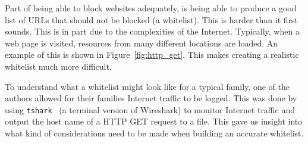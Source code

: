Part of being able to block websites adequately, is being able to produce a
good list of URLs that should not be blocked (a whitelist). This is harder than
it first sounds. This is in part due to the complexities of the Internet.
Typically, when a web page is visited, resources from many different locations
are loaded. An example of this is shown in Figure~\ref{fig:http_get}. This
makes creating a realistic whitelist much more difficult.

To understand what a whitelist might look like for a typical family, one of the
authors allowed for their families Internet traffic to be logged. This was done
by using \texttt{tshark}~\cite{tshark} (a terminal version of Wireshark) to
monitor Internet traffic and output the host name of a HTTP GET request to a
file. This gave us insight into what kind of considerations need to be made
when building an accurate whitelist.

